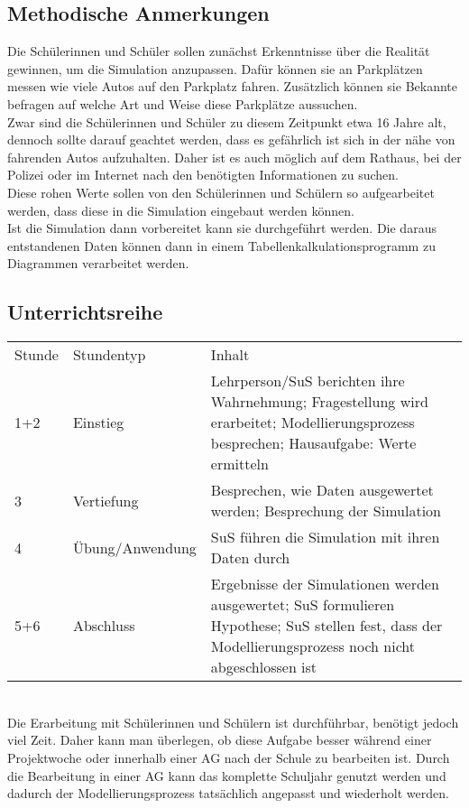 \subsection{Methodische Anmerkungen}

Die Schülerinnen und Schüler sollen zunächst Erkenntnisse über die Realität gewinnen, um die Simulation anzupassen. Dafür können sie an Parkplätzen messen wie viele Autos auf den Parkplatz fahren. Zusätzlich können sie Bekannte befragen auf welche Art und Weise diese Parkplätze aussuchen.\\
Zwar sind die Schülerinnen und Schüler zu diesem Zeitpunkt etwa 16 Jahre alt, dennoch sollte darauf geachtet werden, dass es gefährlich ist sich in der nähe von fahrenden Autos aufzuhalten. Daher ist es auch möglich auf dem Rathaus, bei der Polizei oder im Internet nach den benötigten Informationen zu suchen. \\
Diese rohen Werte sollen von den Schülerinnen und Schülern so aufgearbeitet werden, dass diese in die Simulation eingebaut werden können.\\
 Ist die Simulation dann vorbereitet kann sie durchgeführt werden. Die daraus entstandenen Daten können dann in einem Tabellenkalkulationsprogramm zu Diagrammen verarbeitet werden. 

\subsection{Unterrichtsreihe}

\begin{tabular}{lll}
Stunde & Stundentyp & Inhalt\\
1+2 & Einstieg & Lehrperson/SuS berichten ihre Wahrnehmung; Fragestellung wird erarbeitet; Modellierungsprozess besprechen; Hausaufgabe: Werte ermitteln\\
3 & Vertiefung & Besprechen, wie Daten ausgewertet werden; Besprechung der Simulation\\
4 & Übung/Anwendung & SuS führen die Simulation mit ihren Daten durch\\
5+6 & Abschluss & Ergebnisse der Simulationen werden ausgewertet; SuS formulieren Hypothese; SuS stellen fest, dass der Modellierungsprozess noch nicht abgeschlossen ist
\end{tabular}\\

Die Erarbeitung mit Schülerinnen und Schülern ist durchführbar, benötigt jedoch viel Zeit. Daher kann man überlegen, ob diese Aufgabe besser während einer Projektwoche oder innerhalb einer AG nach der Schule zu bearbeiten ist. Durch die Bearbeitung in einer AG kann das komplette Schuljahr genutzt werden und dadurch der Modellierungsprozess tatsächlich angepasst und wiederholt werden.